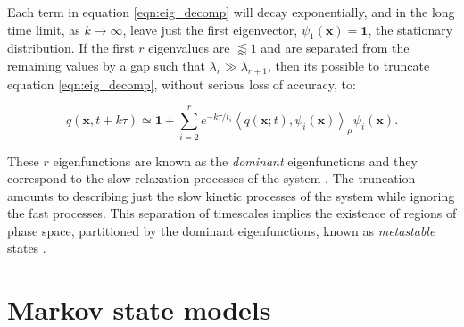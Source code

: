 Each term in equation \ref{eqn:eig_decomp} will decay exponentially, and in the long time limit, as $k \rightarrow \infty$, leave just the first eigenvector, $\psi_{1}(\mathbf{x})=\mathbf{1}$, the stationary distribution. If the first $r$ eigenvalues are $\lessapprox 1$ and are separated from the remaining values by a gap such that $\lambda_{r} \gg \lambda_{r+1}$, then its possible to truncate equation \ref{eqn:eig_decomp}, without serious loss of accuracy, to:

\begin{equation}\label{eqn:eig_decomp_to_r}
q(\mathbf{x},  t+k \tau)  \simeq \mathbf{1}+\sum_{i=2}^{r} e^{-k \tau / t_{i}}\left\langle q(\mathbf{x} ; t), \psi_{i}(\mathbf{x})\right\rangle_{\mu} \psi_{i}(\mathbf{x}).
\end{equation}

These $r$ eigenfunctions are known as the \emph{dominant} eigenfunctions and they correspond to the slow relaxation processes of the system \cite{prinzMarkovModelsMolecular2011}. The truncation amounts to describing just the slow kinetic processes of the system while ignoring the fast processes. This separation of timescales implies the existence of regions of phase space, partitioned by the dominant eigenfunctions, known as \emph{metastable} states \cite{prinzMarkovModelsMolecular2011}.

\section{Markov state models}\label{sec:theory_msm}

